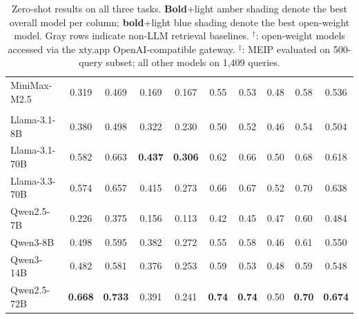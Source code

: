 \documentclass[11pt]{article}
\begin{document}
\begin{table}[!t]
\begin{tabular}{@{}lcc|cc|ccccc@{}}
MiniMax-M2.5
& 0.319 & 0.469 & 0.169 & 0.167
& 0.55 & 0.53 & 0.48 & 0.58 & 0.536 \\

\addlinespace[1pt]
\midrule

\multicolumn{10}{@{}l}{\textit{Open-weight models (local deployment}} \\
\midrule
Llama-3.1-8B
& 0.380 & 0.498 & 0.322 & 0.230
& 0.50 & 0.52 & 0.46 & 0.54 & 0.504 \\


Llama-3.1-70B
& 0.582 & 0.663
& \cellcolor{openblue}\textbf{0.437}
& \cellcolor{openblue}\textbf{0.306}
& 0.62 & 0.66 & 0.50 & 0.68 & 0.618 \\

Llama-3.3-70B
& 0.574 & 0.657 & 0.415 & 0.273
& 0.66 & 0.67 & 0.52 & 0.70 & 0.638 \\


Qwen2.5-7B
& 0.226 & 0.375 & 0.156 & 0.113
& 0.42 & 0.45 & 0.47 & 0.60 & 0.484 \\

Qwen3-8B
& 0.498 & 0.595 & 0.382 & 0.272
& 0.55 & 0.58 & 0.46 & 0.61 & 0.550 \\

Qwen3-14B
& 0.482 & 0.581 & 0.376 & 0.253
& 0.59 & 0.53 & 0.48 & 0.59 & 0.548 \\


Qwen2.5-72B
& \cellcolor{openblue}\textbf{0.668}
& \cellcolor{openblue}\textbf{0.733}
& 0.391 & 0.241
& \cellcolor{openblue}\textbf{0.74}
& \cellcolor{openblue}\textbf{0.74}
& 0.50
& \cellcolor{openblue}\textbf{0.70}
& \cellcolor{openblue}\textbf{0.674} \\


\bottomrule
\end{tabular}

\caption{
Zero-shot results on all three tasks.
\textbf{Bold}+\colorbox{sota}{light amber shading} denote the best overall model per column;
\textbf{bold}+\colorbox{openblue}{light blue shading} denote the best open-weight model.
Gray rows indicate non-LLM retrieval baselines.
$^\dagger$: open-weight models accessed via the xty.app OpenAI-compatible gateway.
$^\ddagger$: MEIP evaluated on 500-query subset; all other models on 1{,}409 queries.
}
\label{tab:main}
\end{table}
\end{document}
